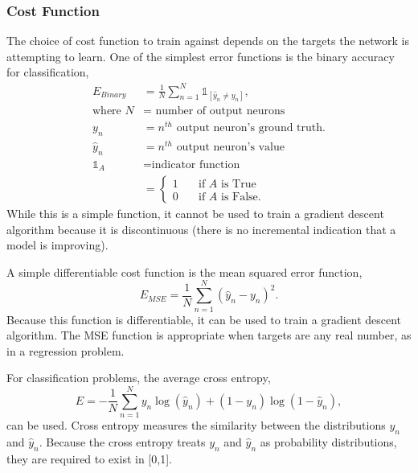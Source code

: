 \subsubsection{Cost Function}

The choice of cost function to train against depends on the targets the network is attempting to learn. One of the simplest error functions is the binary accuracy for classification, 
%
\begin{align} \label{eq:Binary_accuracy}
E_{Binary} &= {\frac{1} N} \sum_{n=1}^N \mathds{1}_[\hat{y}_n \neq y_n ], \\
\text{where } N &= \text{ number of output neurons} \nonumber \\
y_n &= n^{th} \text{ output neuron's ground truth.} \nonumber \\
\hat{y}_n &= n^{th} \text{ output neuron's value} \nonumber \\
\mathds{1}_A &= \text{indicator function} \nonumber \\
&= \nonumber
	\begin{cases}
	1  & \quad \text{if } A \text{ is True}\\
	0  & \quad \text{if } A \text{ is False.}
	\end{cases} \nonumber
\end{align}
While this is a simple function, it cannot be used to train a gradient descent algorithm because it is discontinuous (there is no incremental indication that a model is improving).

A simple differentiable cost function is the mean squared error function,
%
\begin{equation} \label{eq:MSE_error}
E_{MSE} = {\frac{1} N} \sum_{n=1}^N (\hat{y}_n - y_n)^2.
\end{equation}
%
Because this function is differentiable, it can be used to train a gradient descent algorithm. The MSE function is appropriate when targets are any real number, as in a regression problem. 

For classification problems, the average cross entropy, 
%
\begin{equation} \label{eq:CrossEntropy}
E = -{\frac{1} N} \sum_{n=1}^N y_n \log(\hat{y}_n) +  (1-y_n) \log(1-\hat{y}_n), 
\end{equation}
%
can be used. Cross entropy measures the similarity between the distributions $y_n$ and $\hat{y}_n$. Because the cross entropy treats $y_n$ and $\hat{y}_n$ as probability distributions, they are required to exist in [0,1].

